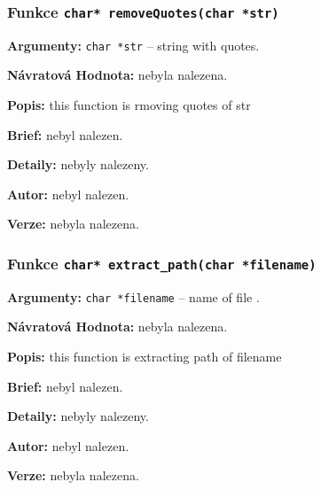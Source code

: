 \documentclass[12pt, a4paper]{article}
\begin{document}
\subsubsection{Funkce \texttt{char* removeQuotes(char *str)}}
\textbf{Argumenty: }\verb"char *str" -- string with quotes. \\
\par\noindent
\textbf{Návratová Hodnota: }nebyla nalezena.\\
\par\noindent
\textbf{Popis: }this function is rmoving quotes of str\\
\par\noindent
\textbf{Brief: }nebyl nalezen.\\
\par\noindent
\textbf{Detaily: }nebyly nalezeny.\\
\par\noindent
\textbf{Autor: }nebyl nalezen.\\
\par\noindent
\textbf{Verze: }nebyla nalezena.\\
\par\noindent
\subsubsection{Funkce \texttt{char* extract\_path(char *filename)}}
\textbf{Argumenty: }\verb"char *filename" -- name of file . \\
\par\noindent
\textbf{Návratová Hodnota: }nebyla nalezena.\\
\par\noindent
\textbf{Popis: }this function is extracting path of filename\\
\par\noindent
\textbf{Brief: }nebyl nalezen.\\
\par\noindent
\textbf{Detaily: }nebyly nalezeny.\\
\par\noindent
\textbf{Autor: }nebyl nalezen.\\
\par\noindent
\textbf{Verze: }nebyla nalezena.\\
\par\noindent
\end{document}
